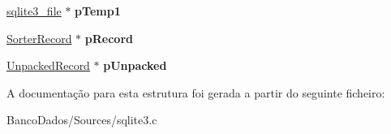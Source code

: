 \begin{DoxyCompactItemize}
\item 
\hypertarget{struct_vdbe_sorter_a8c419244559c715dcff6415b61d0e3ce}{\hyperlink{structsqlite3__file}{sqlite3\-\_\-file} $\ast$ {\bfseries p\-Temp1}}\label{struct_vdbe_sorter_a8c419244559c715dcff6415b61d0e3ce}

\item 
\hypertarget{struct_vdbe_sorter_aedb82586e8b8710b2ef95a950d937893}{\hyperlink{struct_sorter_record}{Sorter\-Record} $\ast$ {\bfseries p\-Record}}\label{struct_vdbe_sorter_aedb82586e8b8710b2ef95a950d937893}

\item 
\hypertarget{struct_vdbe_sorter_a0d85cdf1cf25c75cf90394d1bcfd27b9}{\hyperlink{struct_unpacked_record}{Unpacked\-Record} $\ast$ {\bfseries p\-Unpacked}}\label{struct_vdbe_sorter_a0d85cdf1cf25c75cf90394d1bcfd27b9}

\end{DoxyCompactItemize}


A documentação para esta estrutura foi gerada a partir do seguinte ficheiro\-:\begin{DoxyCompactItemize}
\item 
Banco\-Dados/\-Sources/sqlite3.\-c\end{DoxyCompactItemize}

